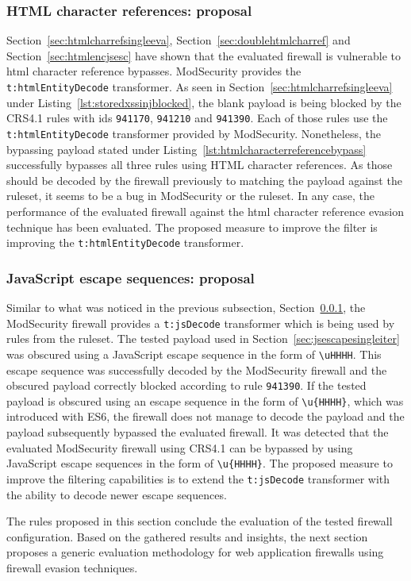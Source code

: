 \subsubsection{HTML character references: proposal}
\label{sec:htmlcharrefprop}
Section~\ref{sec:htmlcharrefsingleeva}, Section~\ref{sec:doublehtmlcharref} and Section~\ref{sec:htmlencjsesc} have shown that the evaluated firewall is vulnerable to \acrshort{html} character reference bypasses. ModSecurity provides the \verb|t:htmlEntityDecode| transformer. As seen in Section~\ref{sec:htmlcharrefsingleeva} under Listing~\ref{lst:storedxssinjblocked}, the blank payload is being blocked by the CRS4.1 rules with ids \verb|941170|, \verb|941210| and \verb|941390|. Each of those rules use the \verb|t:htmlEntityDecode| transformer provided by ModSecurity. Nonetheless, the bypassing payload stated under Listing~\ref{lst:htmlcharacterreferencebypass} successfully bypasses all three rules using HTML character references. As those should be decoded by the firewall previously to matching the payload against the ruleset, it seems to be a bug in ModSecurity or the ruleset. In any case, the performance of the evaluated firewall against the \acrshort{html} character reference evasion technique has been  evaluated. The proposed measure to improve the filter is improving the \verb|t:htmlEntityDecode| transformer.

\subsubsection{JavaScript escape sequences: proposal}
\label{sec:jsescprop}
Similar to what was noticed in the previous subsection, Section~\ref{sec:htmlcharrefprop}, the ModSecurity firewall provides a \verb|t:jsDecode| transformer which is being used by rules from the ruleset. The tested payload used in Section~\ref{sec:jsescapesingleiter} was obscured using a JavaScript escape sequence in the form of \verb|\uHHHH|. This escape sequence was successfully decoded by the ModSecurity firewall and the obscured payload correctly blocked according to rule \verb|941390|. If the tested payload is obscured using an escape sequence in the form of \verb|\u{HHHH}|, which was introduced with ES6, the firewall does not manage to decode the payload and the payload subsequently bypassed the evaluated firewall. It was detected that the evaluated ModSecurity firewall using CRS4.1 can be bypassed by using JavaScript escape sequences in the form of \verb|\u{HHHH}|. The proposed measure to improve the filtering capabilities is to extend the \verb|t:jsDecode| transformer with the ability to decode newer escape sequences.

\bigskip
The rules proposed in this section conclude the evaluation of the tested firewall configuration. Based on the gathered results and insights, the next section proposes a generic evaluation methodology for web application firewalls using firewall evasion techniques.
